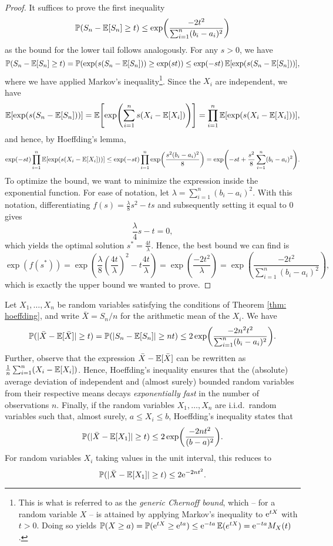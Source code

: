 \begin{proof}
It suffices to prove the first inequality
\[
    \operatorname{\mathbb{P}}(S_n - \operatorname{\mathbb{E}}[S_n] \geq t) \leq \exp(\frac{-2t^2}{\sum_{i=1}^n (b_i - a_i)^2})
\]
as the bound for the lower tail follows analogously. For any $s>0$, we have
\[
    \operatorname{\mathbb{P}}(S_n - \operatorname{\mathbb{E}}[S_n] \geq t) = \operatorname{\mathbb{P}}(\exp(s(S_n - \operatorname{\mathbb{E}}[S_n])) \geq \exp(st)) \leq \exp(-st) \operatorname{\mathbb{E}}[\exp(s(S_n - \operatorname{\mathbb{E}}[S_n]))],
\]
where we have applied Markov's inequality\footnote{This is what is referred to as the \emph{generic Chernoff bound}, which -- for a random variable $X$ -- is attained by applying Markov's inequality to $\mathrm{e}^{tX}$ with $t > 0$. Doing so yields $\operatorname{\mathbb{P}}(X \geq a) = \operatorname{\mathbb{P}}(\mathrm{e}^{tX} \geq \mathrm{e}^{ta}) \leq \mathrm{e}^{-ta} \operatorname{\mathbb{E}}(e^{tX}) = \mathrm{e}^{-ta} M_X(t)$.}. Since the $X_i$ are independent, we have
\[
    \Exp[\exp(s(S_n - \Exp[S_n]))] = \Exp\left[\exp(\sum_{i=1}^n s(X_i - \Exp[X_i]))\right] = \prod_{i=1}^n \Exp[\exp(s(X_i - \Exp[X_i]))],
\]
and hence, by Hoeffding's lemma,
\[
    \exp(-st) \prod_{i=1}^n \operatorname{\mathbb{E}}[\exp(s(X_i - \operatorname{\mathbb{E}}[X_i]))] \leq \exp(-st) \prod_{i=1}^n \exp(\frac{s^2 (b_i - a_i)^2}{8}) = \exp(-st + \frac{s^2}{8} \sum_{i=1}^n (b_i - a_i)^2).
\]
To optimize the bound, we want to minimize the expression inside the exponential function. For ease of notation, let $\lambda = \sum_{i=1}^n (b_i - a_i)^2$. With this notation, differentiating $f(s) = \frac{\lambda}{8} s^2 - ts$ and subsequently setting it equal to $0$ gives
\[
    \frac{\lambda}{4} s - t = 0,
\]
which yields the optimal solution $s^* = \frac{4t}{\lambda}$. Hence, the best bound we can find is
\[
    \exp(f(s^*)) = \exp(\frac{\lambda}{8} \left(\frac{4t}{\lambda}\right)^2 - t \frac{4t}{\lambda}) = \exp(\frac{-2t^2}{\lambda}) = \exp(\frac{-2t^2}{\sum_{i=1}^n (b_i - a_i)^2}),
\]
which is exactly the upper bound we wanted to prove.
\end{proof}

\begin{remark}
Let $X_1, \dots, X_n$ be random variables satisfying the conditions of Theorem \ref{thm: hoeffding}, and write $\bar{X} = S_n/n$ for the arithmetic mean of the $X_i$. We have
\[
    \Prob(\abs*{\bar{X} - \Exp[\bar{X}]} \geq t) = \Prob(\abs{S_n - \Exp[S_n]} \geq nt) \leq 2 \exp(\frac{-2 n^2 t^2}{\sum_{i=1}^n (b_i - a_i)^2}).
\]
Further, observe that the expression $\bar{X} - \operatorname{\mathbb{E}}[\bar{X}]$ can be rewritten as $\frac{1}{n} \sum_{i=1}^n (X_i - \operatorname{\mathbb{E}}[X_i])$. Hence, Hoeffding's inequality ensures that the (absolute) average deviation of independent and (almost surely) bounded random variables from their respective means decays \emph{exponentially fast} in the number of observations $n$. Finally, if the random variables $X_1, \dots, X_n$ are i.i.d.\ random variables such that, almost surely, $a \leq X_i \leq b$, Hoeffding's inequality states that
\[
    \Prob(\abs*{\bar{X} - \Exp[X_1]} \geq t) \leq 2 \exp(\frac{-2nt^2}{(b - a)^2}).
\]
For random variables $X_i$ taking values in the unit interval, this reduces to
\[
    \Prob(\abs*{\bar{X} - \Exp[X_1]} \geq t) \leq 2 \e^{-2nt^2}.
\]
\end{remark}
